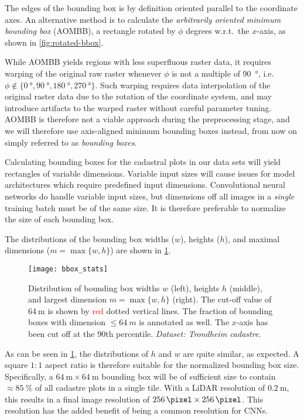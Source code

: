 The edges of the bounding box is by definition oriented parallel to the coordinate axes.
An alternative method is to calculate the \textit{arbitrarily oriented minimum bounding box} (AOMBB), a rectangle rotated by $\phi$ degrees w.r.t.\ the $x$-axis, as shown in \cref{fig:rotated-bbox}.

While AOMBB yields regions with less superfluous raster data, it requires warping of the original raw raster whenever $\phi$ is not a multiple of \SI{90}{\degree}, i.e.\ $\phi \not\in \{ \SI{0}{\degree}, \SI{90}{\degree}, \SI{180}{\degree}, \SI{270}{\degree} \}$.
Such warping requires data interpolation of the original raster data due to the rotation of the coordinate system, and may introduce artifacts to the warped raster without careful parameter tuning.
AOMBB is therefore not a viable approach during the preprocessing stage, and we will therefore use axis-aligned minimum bounding boxes instead, from now on simply referred to as \textit{bounding boxes}.

Calculating bounding boxes for the cadastral plots in our data sets will yield rectangles of variable dimensions.
Variable input sizes will cause issues for model architectures which require predefined input dimensions.
Convolutional neural networks do handle variable input sizes, but dimensions off all images in a \textit{single} training batch must be of the same size.
It is therefore preferable to normalize the size of each bounding box.

The distributions of the bounding box widths ($w$), heights ($h$), and maximal dimensions ($m = \max \{w, h\}$) are shown in \cref{fig:bbox-stats}.

\begin{figure}[htb]
  \texttt{[image: bbox\_stats]}
  \caption[Distribution of bounding box dimensions.]{%
    Distribution of bounding box widths $w$ (left), heights $h$ (middle), and largest dimension $m = \max \{w, h\}$ (right).
    The cut-off value of $\SI{64}{\meter}$ is shown by \textcolor{red}{red} dotted vertical lines.
    The fraction of bounding boxes with dimension $\leq \SI{64}{m}$ is annotated as well.
    The $x$-axis has been cut off at the 90th percentile.
    \textit{Dataset: Trondheim cadastre}.
  }%
  \label{fig:bbox-stats}
\end{figure}

As can be seen in \cref{fig:bbox-stats}, the distributions of $h$ and $w$ are quite similar, as expected.
A square $1:1$ aspect ratio is therefore suitable for the normalized bounding box size.
Specifically, a $\SI{64}{\meter} \times \SI{64}{\meter}$ bounding box will be of sufficient size to contain $\approx \SI{85}{\percent}$ of all cadastre plots in a single tile.
With a LiDAR resolution of $\SI{0.2}{\meter}$, this results in a final image resolution of $\SI{256}{\pixel} \times \SI{256}{\pixel}$.
This resolution has the added benefit of being a common resolution for CNNs.

